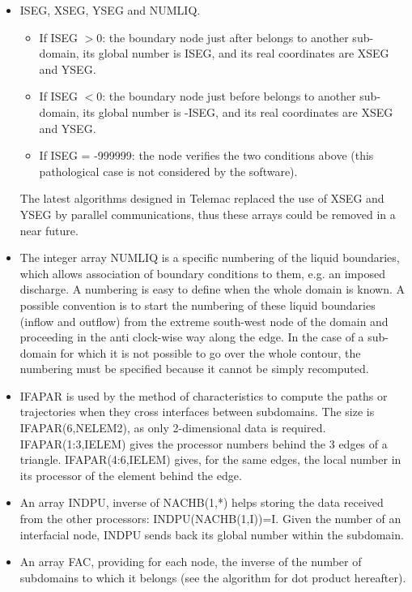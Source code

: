 \begin{itemize}
  \item ISEG, XSEG, YSEG and NUMLIQ.
    \begin{itemize}
      \item If ISEG $>$0: the boundary node just after belongs to another
        sub-domain, its global number is ISEG, and its real coordinates are
        XSEG and YSEG.
      \item If ISEG $<$0: the boundary node just before belongs to another
        sub-domain, its global number is -ISEG, and its real coordinates are
        XSEG and YSEG.
      \item If ISEG = -999999: the node verifies the two conditions above (this
        pathological case is not considered by the software).
    \end{itemize}
    The latest algorithms designed in Telemac replaced the use of XSEG and YSEG
    by parallel communications, thus these arrays could be removed in a near
    future.
\item The integer array NUMLIQ is a specific numbering of the liquid
  boundaries, which allows association of boundary conditions to them, e.g. an
  imposed discharge. A numbering is easy to define when the whole domain is
  known. A possible convention is to start the numbering of these liquid
  boundaries (inflow and outflow) from the extreme south-west node of the
  domain and proceeding in the anti clock-wise way along the edge. In the case
  of a sub-domain for which it is not possible to go over the whole contour,
  the numbering must be specified because it cannot be simply recomputed.

\item IFAPAR is used by the method of characteristics to compute the
  paths or trajectories when they cross interfaces between subdomains. The
  size is IFAPAR(6,NELEM2), as only 2-dimensional data is required.
  IFAPAR(1:3,IELEM) gives the processor numbers behind the 3 edges of a
  triangle. IFAPAR(4:6,IELEM) gives, for the same edges, the local number in
  its processor of the element behind the edge.

\item An array INDPU, inverse of NACHB(1,*) helps storing the data
  received from the other processors: INDPU(NACHB(1,I))=I. Given the number of
  an interfacial node, INDPU sends back its global number within the
  subdomain.

\item An array FAC, providing for each node, the inverse of the number
  of subdomains to which it belongs (see the algorithm for dot product
  hereafter).
\end{itemize}

